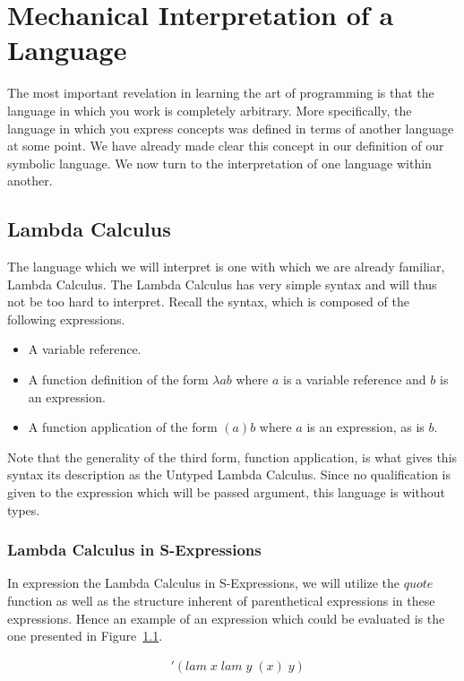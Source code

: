 
\chapter{Mechanical Interpretation of a Language}
The most important revelation in learning the art of programming is that the 
language in which you work is completely arbitrary. More specifically, the 
language in which you express concepts was defined in terms of another language 
at some point. We have already made clear this concept in our definition of our 
symbolic language. We now turn to the interpretation of one language within 
another.

\section{Lambda Calculus}
The language which we will interpret is one with which we are already familiar, 
Lambda Calculus. The Lambda Calculus has very simple syntax and will thus not 
be too hard to interpret. Recall the syntax, which is composed of the following 
expressions.

\begin{itemize}
  \item A variable reference.
  \item A function definition of the form $\lambda a b$ where $a$ is a variable reference and $b$ is an expression.
  \item A function application of the form $(a)b$ where $a$ is an expression, as is $b$.
\end{itemize}

Note that the generality of the third form, function application, is what gives 
this syntax its description as the Untyped Lambda Calculus. Since no 
qualification is given to the expression which will be passed argument, this 
language is without types.

\subsection{Lambda Calculus in S-Expressions}
In expression the Lambda Calculus in S-Expressions, we will utilize the $quote$ 
function as well as the structure inherent of parenthetical expressions in these 
expressions. Hence an example of an expression which could be evaluated is the
one presented in Figure~\ref{fig:sexprLambda}.

\begin{figure}[htp]
\footnotesize
\caption{}\label{fig:sexprLambda}
\begin{align*}
& '(lam \; x \; lam \; y \; (x) \; y)
\end{align*}
\end{figure}

